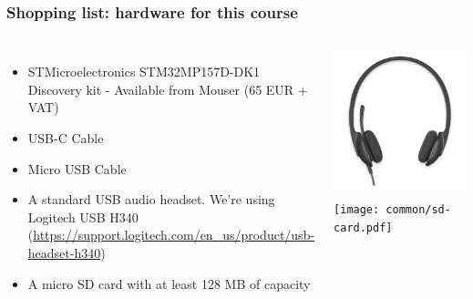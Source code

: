 \begin{frame}
\frametitle{Shopping list: hardware for this course}
  \begin{columns}
    \footnotesize
    \begin{itemize}
      \item STMicroelectronics STM32MP157D-DK1 Discovery kit -
        Available from Mouser (65 EUR + VAT)
      \item USB-C Cable
      \item Micro USB Cable
      \item A standard USB audio headset. We're using Logitech USB H340
	    (\url{https://support.logitech.com/en_us/product/usb-headset-h340})
      \item A micro SD card with at least 128 MB of capacity
    \end{itemize}
    \includegraphics[height=0.15\textheight]{common/logitech-h340.png} \\
    \vspace{1cm}
    \texttt{[image: common/sd-card.pdf]}
  \end{columns}
\end{frame}
